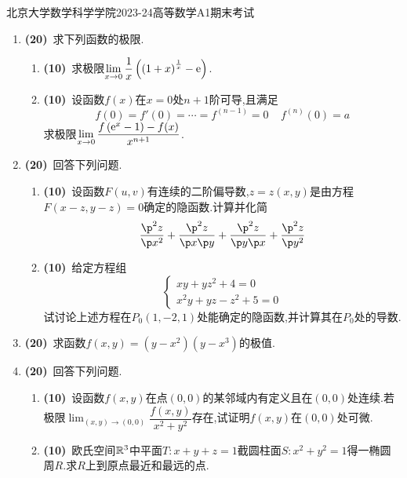 \documentclass{ctexart}
\begin{document}
\pagestyle{empty}

\begin{center}\Large
    北京大学数学科学学院2023-24高等数学A1期末考试
\end{center}
\begin{enumerate}[leftmargin=*,label=\textbf{\arabic*.}]
    \item \textbf{(20)}\ 求下列函数的极限.
        \begin{enumerate}[label=\tbf{(\arabic*)}]
            \item \textbf{(10)}\ 求极限$\displaystyle\lim_{x\to0}\dfrac1x\left(\left(1+x\right)^{\frac1x}-\mathrm{e}\right)$.
            \item \textbf{(10)}\ 设函数$f(x)$在$x=0$处$n+1$阶可导,且满足\[f(0)=f'(0)=\cdots=f^{(n-1)}=0\ \ \ \ \ f^{(n)}(0)=a\]求极限$\displaystyle\lim_{x\to0}\dfrac{f\left(\mathrm{e}^x-1\right)-f(x)}{x^{n+1}}$.
        \end{enumerate}
    \item \textbf{(20)}\ 回答下列问题.
        \begin{enumerate}[label=\tbf{(\arabic*)}]
            \item \textbf{(10)}\ 设函数$F(u,v)$有连续的二阶偏导数,$z=z(x,y)$是由方程$F(x-z,y-z)=0$确定的隐函数.计算并化简
                \[\dfrac{\p^2z}{\p x^2}+\dfrac{\p^2z}{\p x\p y}+\dfrac{\p^2z}{\p y\p x}+\dfrac{\p^2z}{\p y^2}\]
            \item \textbf{(10)}\ 给定方程组
                \[\left\{\begin{array}{l}
                    xy+yz^2+4=0\\
                    x^2y+yz-z^2+5=0
                \end{array}\right.\]
                试讨论上述方程在$P_0\left(1,-2,1\right)$处能确定的隐函数,并计算其在$P_0$处的导数.
        \end{enumerate}
    \item \textbf{(20)}\ 求函数$f(x,y)=\left(y-x^2\right)\left(y-x^3\right)$的极值.
    \item \textbf{(20)}\ 回答下列问题.
        \begin{enumerate}[label=\tbf{(\arabic*)}]
            \item \textbf{(10)}\ 设函数$f(x,y)$在点$(0,0)$的某邻域内有定义且在$(0,0)$处连续.若极限$\displaystyle\lim_{(x,y)\to(0,0)}\dfrac{f(x,y)}{x^2+y^2}$存在,试证明$f(x,y)$在$(0,0)$处可微.
            \item \textbf{(10)}\ 欧氏空间$\mathbb{R}^3$中平面$T:x+y+z=1$截圆柱面$S:x^2+y^2=1$得一椭圆周$R$.求$R$上到原点最近和最远的点.

\end{enumerate}
\end{enumerate}
\end{document}
